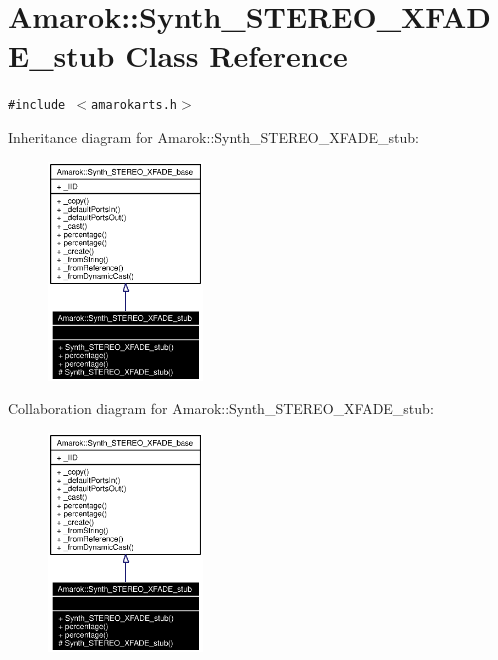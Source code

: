 \section{Amarok::Synth\_\-STEREO\_\-XFADE\_\-stub Class Reference}
\label{classAmarok_1_1Synth__STEREO__XFADE__stub}
{\tt \#include $<$amarokarts.h$>$}

Inheritance diagram for Amarok::Synth\_\-STEREO\_\-XFADE\_\-stub:\begin{figure}[H]
\begin{center}
\leavevmode
\includegraphics[width=116pt]{classAmarok_1_1Synth__STEREO__XFADE__stub__inherit__graph}
\end{center}
\end{figure}
Collaboration diagram for Amarok::Synth\_\-STEREO\_\-XFADE\_\-stub:\begin{figure}[H]
\begin{center}
\leavevmode
\includegraphics[width=116pt]{classAmarok_1_1Synth__STEREO__XFADE__stub__coll__graph}
\end{center}
\end{figure}
